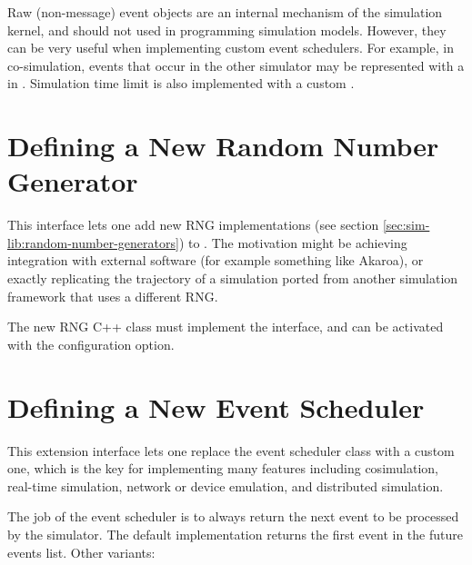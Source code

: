 Raw (non-message) event objects are an internal mechanism of the {\opp}
simulation kernel, and should not used in programming simulation models.
However, they can be very useful when implementing custom event schedulers.
For example, in co-simulation, events that occur in the other simulator may
be represented with a  in {\opp}. Simulation time limit
is also implemented with a custom .


\section{Defining a New Random Number Generator}
\label{sec:plugin-exts:rng}

This interface lets one add new RNG implementations (see section
\ref{sec:sim-lib:random-number-generators}) to {\opp}.
The motivation might be achieving integration with external software (for
example something like Akaroa), or exactly replicating the trajectory of a
simulation ported from another simulation framework that uses a different
RNG.

The new RNG C++ class must implement the  interface,
and can be activated with the  configuration option.


\section{Defining a New Event Scheduler}
\label{sec:plugin-exts:scheduler}

This extension interface lets one replace the event scheduler class with a
custom one, which is the key for implementing many features including
cosimulation, real-time simulation, network or device emulation, and
distributed simulation.

The job of the event scheduler is to always return the next event to be
processed by the simulator. The default implementation returns the first
event in the future events list. Other variants:

